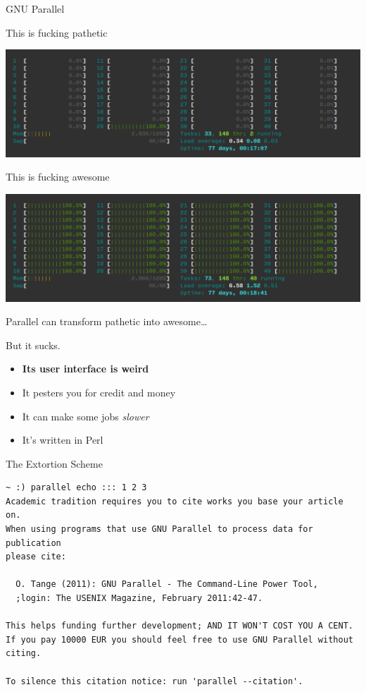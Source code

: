 \documentclass{beamer}
\renewcommand\big[1]{
  \begin{center}
    \Large{#1}
  \end{center}
}
\begin{document}
\begin{frame}
  \centering\Huge{GNU Parallel}
\end{frame}

\begin{frame}
  \big{This is fucking pathetic}
  \includegraphics[scale=0.25]{pathetic.png}
\end{frame}

\begin{frame}
  \big{This is fucking awesome}
  \includegraphics[scale=0.25]{awesome.png}
\end{frame}

\begin{frame}
  \big{Parallel can transform pathetic into awesome\ldots}
  \pause
  \big{But it sucks.}
  \pause
  \begin{itemize}
    \item \textbf{Its user interface is weird}
    \item It pesters you for credit and money
    \item It can make some jobs \emph{slower}
    \item It's written in Perl
  \end{itemize}
\end{frame}

\begin{frame}[fragile]
  \big{The Extortion Scheme}
  \tiny
\begin{verbatim}
~ :) parallel echo ::: 1 2 3
Academic tradition requires you to cite works you base your article on.
When using programs that use GNU Parallel to process data for publication
please cite:

  O. Tange (2011): GNU Parallel - The Command-Line Power Tool,
  ;login: The USENIX Magazine, February 2011:42-47.

This helps funding further development; AND IT WON'T COST YOU A CENT.
If you pay 10000 EUR you should feel free to use GNU Parallel without citing.

To silence this citation notice: run 'parallel --citation'.
\end{verbatim}
\end{frame}
\end{document}
